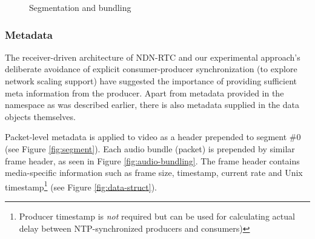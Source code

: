 \documentclass{icn/sig-alternate-2013} %
\newcommand{\ndnrtcName}{NDN-RTC} %
\begin{document}
\begin{figure}[t!]
\centering
{}
\caption{Segmentation and bundling}
\end{figure}

\subsubsection{Metadata}

The receiver-driven architecture of \ndnrtcName{} and our experimental approach's deliberate avoidance of explicit consumer-producer synchronization (to explore network scaling support) have suggested the importance of providing sufficient meta information from the producer. Apart from metadata provided in the namespace as was described earlier, there is also metadata supplied in the data objects themselves.
%

Packet-level metadata is applied to video as a header prepended to segment \#0 (see Figure \ref{fig:segment}). Each audio bundle (packet) is prepended by similar frame header, as seen in Figure \ref{fig:audio-bundling}. 
The frame header contains media-specific information such as frame size, timestamp, current rate and Unix timestamp\footnote{Producer timestamp is \textit{not} required but can be used for calculating actual delay between NTP-synchronized producers and consumers)} (see Figure \ref{fig:data-struct}).
\end{document}
